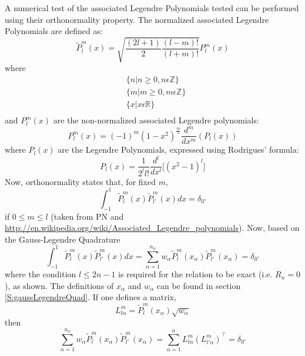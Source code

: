 \documentclass{revtex4-1}
\begin{document}
A numerical test of the associated Legendre Polynomials tested can be performed using their orthonormality property. The normalized associated Legendre Polynomials are defined as:
\begin{equation}
\widetilde{P}^{m}_{l}(x) = \sqrt{\frac{\left(2l+1\right)}{2}\frac{\left(l-m\right)!}{\left(l+m\right)!}} P^{m}_{l}(x)
\end{equation}
where
\begin{align*}
&\{n | n \geq0, n \epsilon \mathbb{Z} \}\\
&\{m | m \geq0, m \epsilon \mathbb{Z} \}\\
&\{x | x \epsilon \mathbb{R} \}\\
\end{align*}
and $P^{m}_{l}(x)$ are the non-normalized associated Legendre polynomials:
\begin{equation}
P^{m}_{l}\left(x\right)=\left(-1\right)^{m}\left(1-x^{2}\right)^{\frac{m}{2}}\frac{d^{m}}{dx^{m}}\left(P_{l}\left(x\right)\right)
\end{equation}
where $P_{l}\left(x\right)$ are the Legendre Polynomials, expressed using Rodrigues' formula:
\begin{equation}
P_{l}\left(x\right)=\frac{1}{2^{l}l!}\frac{d^{l}}{dx^{l}}\lbrack\left(x^{2}-1\right)^{l}\rbrack
\end{equation} 
Now, orthonormality states that, for fixed $m$,
\begin{equation}
\int_{-1}^{1} \widetilde{P}^{m}_{l}(x) \widetilde{P}^{m}_{l'}(x) dx =  \delta_{ll'}
\end{equation}
if $0 \leq m \leq l$ (taken from PN and \url{http://en.wikipedia.org/wiki/Associated_Legendre_polynomials}).
Now, based on the Gauss-Legendre Quadrature
\begin{equation}
\int_{-1}^{1} \widetilde{P}^{m}_{l}(x) \widetilde{P}^{m}_{l'}(x) dx = \sum_{\alpha=1}^{n_{\alpha}}w_{\alpha}\widetilde{P}^{m}_{l}(x_{\alpha})\widetilde{P}^{m}_{l'}(x_{\alpha}) = \delta_{ll'}
\end{equation}
where the condition $l \leq 2n-1$ is required for the relation to be exact (i.e. $R_{n}=0$), as shown. The definitions of $x_{\alpha}$ and $w_{\alpha}$ can be found in section \ref{S:gaussLegendreQuad}. If one defines a matrix,
\begin{equation}
L^{m}_{l \alpha} = \widetilde{P}^{m}_{l}(x_{\alpha})\sqrt{w_{\alpha}}
\end{equation}
then
\begin{equation}
\sum_{\alpha=1}^{n_{\alpha}}w_{\alpha}\widetilde{P}^{m}_{l}(x_{\alpha})\widetilde{P}^{m}_{l'}(x_{\alpha}) = \sum_{\alpha=1}^{n}L^{m}_{l \alpha}(L^{m}_{l' \alpha})^{\intercal} = \delta_{ll'}
\end{equation}
\end{document}
